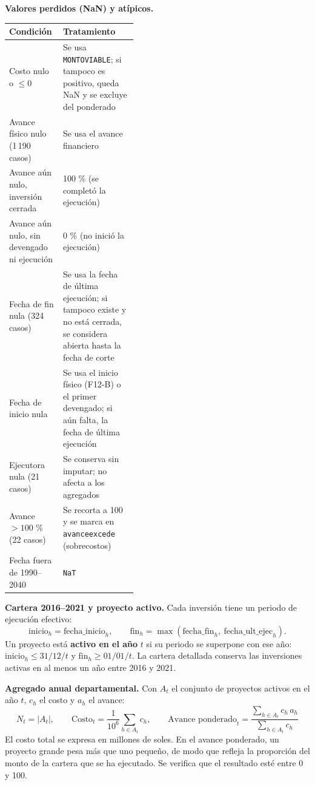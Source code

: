 \documentclass[12pt,a4paper]{article}
\newcommand{\var}[1]{{\renewcommand{\_}{\textunderscore\allowbreak}\texttt{#1}}}
\begin{document}
\textbf{Valores perdidos (NaN) y atípicos.}

\begin{center}\small
\begin{tabularx}{\linewidth}{@{}>{\raggedright\arraybackslash}p{0.42\linewidth}L@{}}
\toprule
\textbf{Condición} & \textbf{Tratamiento}\\
\midrule
Costo nulo o $\le 0$ & Se usa \var{MONTO\_VIABLE}; si tampoco es positivo, queda NaN y se excluye del ponderado\\
Avance físico nulo (1\,190 casos) & Se usa el avance financiero\\
Avance aún nulo, inversión cerrada & 100 \% (se completó la ejecución)\\
Avance aún nulo, sin devengado ni ejecución & 0 \% (no inició la ejecución)\\
Fecha de fin nula (324 casos) & Se usa la fecha de última ejecución; si tampoco existe y no está cerrada, se considera abierta hasta la fecha de corte\\
Fecha de inicio nula & Se usa el inicio físico (F12-B) o el primer devengado; si aún falta, la fecha de última ejecución\\
Ejecutora nula (21 casos) & Se conserva sin imputar; no afecta a los agregados\\
Avance $> 100$ \% (22 casos) & Se recorta a 100 y se marca en \var{avance\_excede\_100} (sobrecostos)\\
Fecha fuera de 1990--2040 & \var{NaT}\\
\bottomrule
\end{tabularx}
\end{center}

\textbf{Cartera 2016--2021 y proyecto activo.} Cada inversión tiene un periodo de ejecución
efectivo:
\[
\text{inicio}_h = \text{fecha\_inicio}_h, \qquad
\text{fin}_h = \max(\text{fecha\_fin}_h,\ \text{fecha\_ult\_ejec}_h).
\]
Un proyecto está \textbf{activo en el año} $t$ si su periodo se superpone con ese año:
$\text{inicio}_h \le 31/12/t$ y $\text{fin}_h \ge 01/01/t$. La cartera detallada conserva
las inversiones activas en al menos un año entre 2016 y 2021.

\textbf{Agregado anual departamental.} Con $A_t$ el conjunto de proyectos activos en el año
$t$, $c_h$ el costo y $a_h$ el avance:
\[
N_t = |A_t|, \qquad
\text{Costo}_t = \frac{1}{10^6}\sum_{h \in A_t} c_h, \qquad
\text{Avance ponderado}_t = \frac{\sum_{h \in A_t} c_h\, a_h}{\sum_{h \in A_t} c_h}
\]
El costo total se expresa en millones de soles. En el avance ponderado, un proyecto grande
pesa más que uno pequeño, de modo que refleja la proporción del monto de la cartera que se
ha ejecutado. Se verifica que el resultado esté entre 0 y 100.
\end{document}
